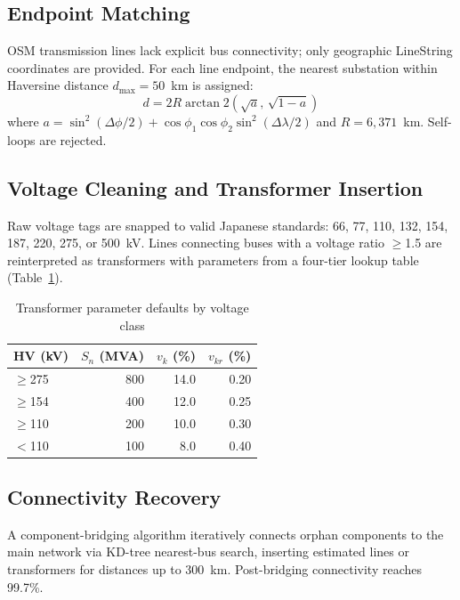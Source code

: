 \documentclass[journal]{IEEEtran}
\begin{document}
\subsection{Endpoint Matching}
OSM transmission lines lack explicit bus connectivity; only geographic LineString coordinates are provided. For each line endpoint, the nearest substation within Haversine distance $d_\text{max} = 50$~km is assigned:
\begin{equation}
  d = 2R\arctan2\!\left(\sqrt{a},\,\sqrt{1-a}\right)
  \label{eq:haversine}
\end{equation}
where $a = \sin^2(\Delta\phi/2) + \cos\phi_1 \cos\phi_2 \sin^2(\Delta\lambda/2)$ and $R = 6{,}371$~km. Self-loops are rejected.

\subsection{Voltage Cleaning and Transformer Insertion}
Raw voltage tags are snapped to valid Japanese standards: 66, 77, 110, 132, 154, 187, 220, 275, or 500~kV. Lines connecting buses with a voltage ratio $\geq$1.5 are reinterpreted as transformers with parameters from a four-tier lookup table (Table~\ref{tab:trafo}).

\begin{table}[t]
  \centering
  \caption{Transformer parameter defaults by voltage class}
  \label{tab:trafo}
  \begin{tabular}{lrrr}
    \toprule
    HV (kV) & $S_n$ (MVA) & $v_k$ (\%) & $v_{kr}$ (\%) \\
    \midrule
    $\geq$275 & 800 & 14.0 & 0.20 \\
    $\geq$154 & 400 & 12.0 & 0.25 \\
    $\geq$110 & 200 & 10.0 & 0.30 \\
    $<$110    & 100 &  8.0 & 0.40 \\
    \bottomrule
  \end{tabular}
\end{table}

\subsection{Connectivity Recovery}
A component-bridging algorithm iteratively connects orphan components to the main network via KD-tree nearest-bus search, inserting estimated lines or transformers for distances up to 300~km. Post-bridging connectivity reaches 99.7\%.

\end{document}
